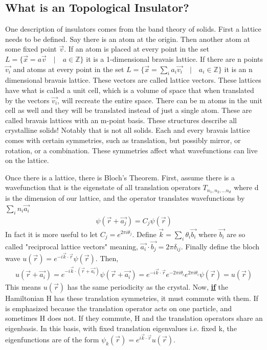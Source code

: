 \subsection{What is an Topological Insulator?}
 One description of insulators comes from the band theory of solids. First a lattice needs to be defined. Say there is an atom at the origin. Then another atom at some fixed point $\vec{v}$. If an atom is placed at every point in the set $L= \{\vec{x} = a\vec{v} \quad | \quad a \in \mathbb{Z} \}$ it is a 1-dimensional bravais lattice. If there are n points $\vec{v_i}$ and atoms at every point in the set $L= \{\vec{x} = \sum_i a_i\vec{v_i} \quad | \quad a_i \in \mathbb{Z} \}$ it is an n dimensional bravais lattice. These vectors are called lattice vectors. These lattices have what is called a unit cell, which is a volume of space that when translated by the vectors $\vec{v_i}$, will recreate the entire space. There can be m atoms in the unit cell as well and they will be translated instead of just a single atom. These are called bravais lattices with an m-point basis. These structures describe all crystalline solids! Notably that is not all solids. Each and every bravais lattice comes with certain symmetries, such as translation, but possibly mirror, or rotation, or a combination. These symmetries affect what wavefunctions can live on the lattice.

Once there is a lattice, there is Bloch's Theorem. First, assume there is a wavefunction that is the eigenstate of all translation operators $T_{n_1,n_2,...n_d}$ where d is the dimension of our lattice, and the operator translates wavefunctions by $\sum_i n_i \vec{a_i}$
\begin{align}
\psi(\vec{r}+\vec{a_j})=C_j\psi(\vec{r})
\end{align}
In fact it is more useful to let $C_j=e^{2 \pi i \theta_j}$. Define $\vec{k} = \sum_i \theta_i\vec{b_i}$ where $\vec{b_i}$ are so called "reciprocal lattice vectors" meaning, $\vec{a_i}\cdot \vec{b_j}=2 \pi \delta_{ij}$. Finally define the bloch wave $u(\vec{r})=e^{-i \vec{k}\cdot \vec{r}}\psi(\vec{r})$. Then,
\begin{align}
u(\vec{r}+\vec{a_i})=e^{-i \vec{k}\cdot (\vec{r}+\vec{a_i})}\psi(\vec{r}+\vec{a_i})=e^{-i \vec{k}\cdot \vec{r}}e^{-2 \pi i \theta_i }e^{2 \pi i \theta_i}\psi(\vec{r})=u(\vec{r})
\end{align}
This means $u(\vec{r})$ has the same periodicity as the crystal. Now, \underline{\textbf{if}} the Hamiltonian H has these translation symmetries, it must commute with them. If is emphasized because the translation operator acts on one particle, and sometimes H does not. If they commute, H and the translation operators share an eigenbasis. In this basis, with fixed translation eigenvalues i.e. fixed k, the eigenfunctions are of the form $\psi_k(\vec{r})=e^{i \vec{k} \cdot \vec{r}} u(\vec{r})$. 

